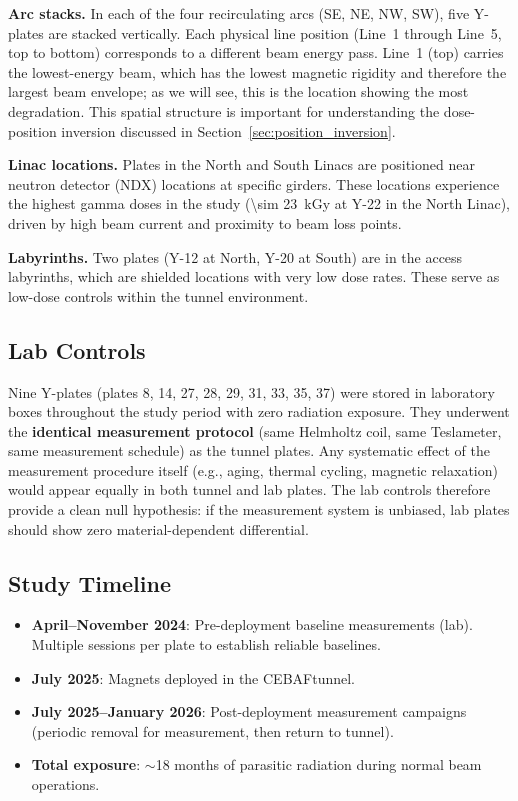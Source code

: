 \documentclass[11pt,letterpaper]{article}
\newcommand{\CEBAF}{CEBAF}
\begin{document}
\textbf{Arc stacks.} In each of the four recirculating arcs (SE, NE, NW, SW),
five Y-plates are stacked vertically. Each physical line position (Line~1
through Line~5, top to bottom) corresponds to a different beam energy pass.
Line~1 (top) carries the lowest-energy beam, which has the lowest magnetic
rigidity and therefore the largest beam envelope; as we will see, this is the location showing the
most degradation. This spatial structure is important for understanding the
dose-position inversion discussed in Section~\ref{sec:position_inversion}.

\textbf{Linac locations.} Plates in the North and South Linacs are positioned
near neutron detector (NDX) locations at specific girders. These locations
experience the highest gamma doses in the study (\SI{\sim 23}{kGy} at Y-22 in
the North Linac), driven by high beam current and proximity to beam loss
points.

\textbf{Labyrinths.} Two plates (Y-12 at North, Y-20 at South) are in the
access labyrinths, which are shielded locations with very low dose rates. These serve as
low-dose controls within the tunnel environment.

\subsection{Lab Controls}

Nine Y-plates (plates 8, 14, 27, 28, 29, 31, 33, 35, 37) were stored in
laboratory boxes throughout the study period with zero radiation exposure. They
underwent the \textbf{identical measurement protocol} (same Helmholtz coil,
same Teslameter, same measurement schedule) as the tunnel plates. Any
systematic effect of the measurement procedure itself (e.g., aging, thermal
cycling, magnetic relaxation) would appear equally in both tunnel and lab
plates. The lab controls therefore provide a clean null hypothesis: if the
measurement system is unbiased, lab plates should show zero
material-dependent differential.

\subsection{Study Timeline}

\begin{itemize}
    \item \textbf{April--November 2024}: Pre-deployment baseline measurements
    (lab). Multiple sessions per plate to establish reliable baselines.
    \item \textbf{July 2025}: Magnets deployed in the \CEBAF tunnel.
    \item \textbf{July 2025--January 2026}: Post-deployment measurement
    campaigns (periodic removal for measurement, then return to tunnel).
    \item \textbf{Total exposure}: $\sim$18 months of parasitic radiation
    during normal beam operations.
\end{itemize}
\end{document}
